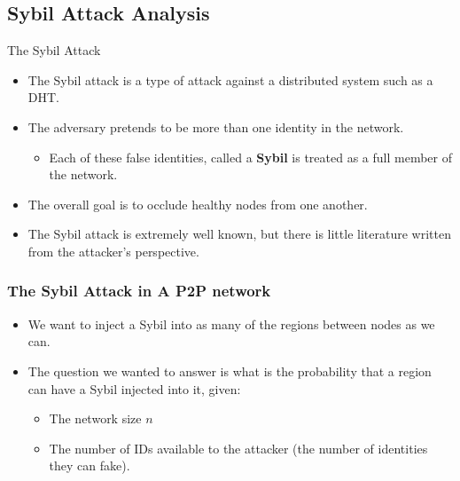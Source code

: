\documentclass[11pt]{beamer}
\begin{document}
\subsection{Sybil Attack Analysis}

\begin{frame}{The Sybil Attack}
	\begin{itemize}
		\item The Sybil attack is a type of attack against a distributed system such as a DHT.
		\item The adversary pretends to be more than one identity in the network.
		\begin{itemize}
			\item Each of these false identities, called a \textbf{Sybil} is treated as a full member of the network.
		\end{itemize}
		\item The overall goal is to occlude healthy nodes from one another.
		\item The Sybil attack is extremely well known, but there is little literature written from the attacker's perspective.
	\end{itemize}
	
\end{frame}



\begin{frame}
	\frametitle{The Sybil Attack in A P2P network}
	\begin{itemize}
		\item We want to inject a Sybil into as many of the regions between nodes as we can.
		\item The question we wanted to answer is what is the probability that a region can have a Sybil injected into it, given:
		\begin{itemize}
			\item The network size $n$
			\item The number of IDs available to the attacker (the number of identities they can fake).
		\end{itemize}
	\end{itemize}
	\end{frame} 
       
\end{document}

